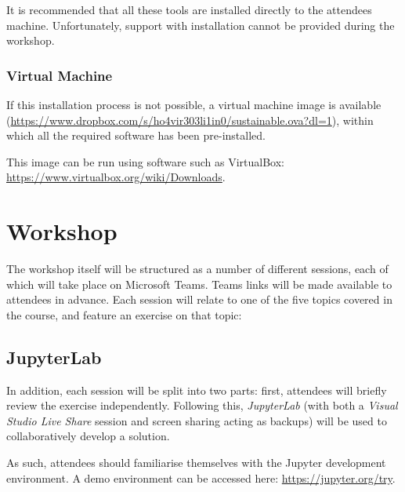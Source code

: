 \documentclass{article}
\begin{document}
It is recommended that all these tools are installed directly to the attendees machine. Unfortunately, support with installation cannot be provided during the workshop.

\subsubsection{Virtual Machine}

If this installation process is not possible, a virtual machine image is available (\href{https://www.dropbox.com/s/ho4vir303li1in0/sustainable.ova?dl=1}{https://www.dropbox.com/s/ho4vir303li1in0/sustainable.ova?dl=1}), within which all the required software has been pre-installed. 

This image can be run using software such as VirtualBox: \newline 
\href{https://www.virtualbox.org/wiki/Downloads}{https://www.virtualbox.org/wiki/Downloads}.

\section{Workshop}

The workshop itself will be structured as a number of different sessions, each of which will take place on Microsoft Teams.
Teams links will be made available to attendees in advance.
Each session will relate to one of the five topics covered in the course, and feature an exercise on that topic:

\begin{table}[h!]

    \centering 
    
    
    
\end{table}

\subsection{JupyterLab}

In addition, each session will be split into two parts: first, attendees will briefly review the exercise independently. 
Following this, \emph{JupyterLab} (with both a \emph{Visual Studio Live Share} session and screen sharing acting as backups) will be used to collaboratively develop a solution.

As such, attendees should familiarise themselves with the Jupyter development environment.
A demo environment can be accessed here: \href{https://jupyter.org/try}{https://jupyter.org/try}.
\end{document}
